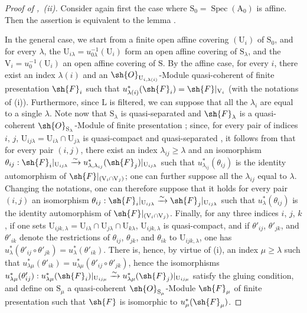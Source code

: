 \begin{proof}[Proof of ,~(ii)]
Consider again first the case where $\mathrm{S}_0=\operatorname{Spec}(\mathrm{A}_0)$ is affine.
Then the assertion is equivalent to the lemma .

In the general case, we start from a finite open affine covering $(\mathrm{U}_i)$ of $\mathrm{S}_0$, and for every $\lambda$, the $\mathrm{U}_{i\lambda}=u_{0\lambda}^{-1}(\mathrm{U}_i)$ form an open affine covering of $\mathrm{S}_\lambda$, and the $\mathrm{V}_i=u_0^{-1}(\mathrm{U}_i)$ an open affine covering of $\mathrm{S}$.
By the affine case, for every $i$, there exist an index $\lambda(i)$ and an $\sh{O}_{\mathrm{U}_{i,\lambda(i)}}$-Module quasi-coherent of finite presentation $\sh{F}_i$ such that $u_{\lambda(i)}^*(\sh{F}_i)=\sh{F}|_{\mathrm{V}_i}$ (with the notations of (i)).
Furthermore, since $\mathrm{L}$ is filtered, we can suppose that all the $\lambda_i$ are equal to a single $\lambda$.
Note now that $\mathrm{S}_\lambda$ is quasi-separated and $\sh{F}_\lambda$ is a quasi-coherent $\sh{O}_{\mathrm{S}_\lambda}$-Module of finite presentation ; since, for every pair of indices $i$, $j$, $\mathrm{U}_{ij\lambda}=\mathrm{U}_{i\lambda}\cap\mathrm{U}_{j\lambda}$ is quasi-compact and quasi-separated , it follows from  that for every pair $(i,j)$, there exist an index $\lambda_{ij}\geqslant\lambda$ and an isomorphism $\theta_{ij}:\sh{F}_i|_{\mathrm{U}_{ij\lambda}}\xrightarrow{\sim}u_{\lambda,\lambda_{ij}}^*(\sh{F}_j)|_{\mathrm{U}_{ij\lambda}}$ such that $u_{\lambda_{ij}}^*(\theta_{ij})$ is the identity automorphism of $\sh{F}|_{(\mathrm{V}_i\cap\mathrm{V}_j)}$; one can further suppose all the $\lambda_{ij}$ equal to $\lambda$.
Changing the notations, one can therefore suppose that it holds for every pair $(i,j)$ an isomorphism $\theta_{ij}:\sh{F}_i|_{\mathrm{U}_{ij\lambda}}\xrightarrow{\sim}\sh{F}_j|_{\mathrm{U}_{ij\lambda}}$ such that $u_\lambda^*(\theta_{ij})$ is the identity automorphism of $\sh{F}|_{(\mathrm{V}_i\cap\mathrm{V}_j)}$.
Finally, for any three indices $i$, $j$, $k$, if one sets $\mathrm{U}_{ijk,\lambda}=\mathrm{U}_{i\lambda}\cap\mathrm{U}_{j\lambda}\cap\mathrm{U}_{k\lambda}$, $\mathrm{U}_{ijk,\lambda}$ is quasi-compact, and if $\theta'_{ij}$, $\theta'_{jk}$, and $\theta'_{ik}$ denote the restrictions of $\theta_{ij}$, $\theta_{jk}$, and $\theta_{ik}$ to $\mathrm{U}_{ijk,\lambda}$, one has $u_\lambda^*(\theta'_{ij}\circ\theta'_{jk})=u_\lambda^*(\theta'_{ik})$.
There is, hence, by virtue of (i), an index $\mu\geqslant\lambda$ such that $u_{\lambda\mu}^*(\theta'_{ik})=u_{\lambda\mu}^*(\theta'_{ij}\circ\theta'_{jk})$, hence the isomorphisms $u_{\lambda\mu}^*(\theta'_{ij}):u_{\lambda\mu}^*(\sh{F}_i)|_{\mathrm{U}_{ij\mu}}\xrightarrow{\sim}u_{\lambda\mu}^*(\sh{F}_j)|_{\mathrm{U}_{ij\mu}}$ satisfy the gluing condition, and define on $\mathrm{S}_\mu$ a quasi-coherent $\sh{O}_{\mathrm{S}_\mu}$-Module $\sh{F}_\mu$ of finite presentation  such that $\sh{F}$ is isomorphic to $u_\mu^*(\sh{F}_\mu)$.
\end{proof}

